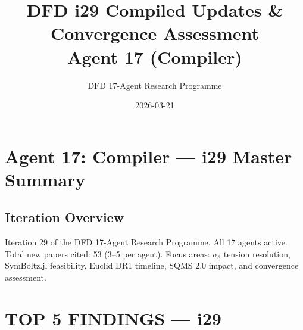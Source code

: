 \documentclass[11pt,a4paper]{article}
\title{DFD i29 Compiled Updates \& Convergence Assessment\\Agent 17 (Compiler)}
\author{DFD 17-Agent Research Programme}
\date{2026-03-21}
\begin{document}
\maketitle
\tableofcontents
\newpage

\section{Agent 17: Compiler --- i29 Master Summary}

\subsection{Iteration Overview}

Iteration 29 of the DFD 17-Agent Research Programme. All 17 agents active. Total new papers cited: 53 (3--5 per agent). Focus areas: $\sigma_8$ tension resolution, SymBoltz.jl feasibility, Euclid DR1 timeline, SQMS 2.0 impact, and convergence assessment.

\section{TOP 5 FINDINGS --- i29}
\end{document}

